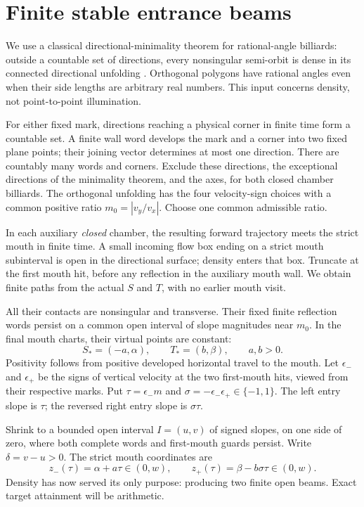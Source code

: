 \documentclass[11pt]{article}
\theoremstyle{definition}
\begin{document}
\section{Finite stable entrance beams}
We use a classical directional-minimality theorem for rational-angle billiards: outside a countable set of directions, every nonsingular semi-orbit is dense in its connected directional unfolding \cite{zk,mt}. Orthogonal polygons have rational angles even when their side lengths are arbitrary real numbers. This input concerns density, not point-to-point illumination.

For either fixed mark, directions reaching a physical corner in finite time form a countable set. A finite wall word develops the mark and a corner into two fixed plane points; their joining vector determines at most one direction. There are countably many words and corners. Exclude these directions, the exceptional directions of the minimality theorem, and the axes, for both closed chamber billiards. The orthogonal unfolding has the four velocity-sign choices with a common positive ratio $m_0=|v_y/v_x|$. Choose one common admissible ratio.

In each auxiliary \emph{closed} chamber, the resulting forward trajectory meets the strict mouth in finite time. A small incoming flow box ending on a strict mouth subinterval is open in the directional surface; density enters that box. Truncate at the first mouth hit, before any reflection in the auxiliary mouth wall. We obtain finite paths from the actual $S$ and $T$, with no earlier mouth visit.

All their contacts are nonsingular and transverse. Their fixed finite reflection words persist on a common open interval of slope magnitudes near $m_0$. In the final mouth charts, their virtual points are constant:
\[
 S_*=(-a,\alpha),\qquad T_*=(b,\beta),\qquad a,b>0.
\]
Positivity follows from positive developed horizontal travel to the mouth. Let $\epsilon_-$ and $\epsilon_+$ be the signs of vertical velocity at the two first-mouth hits, viewed from their respective marks. Put $\tau=\epsilon_-m$ and $\sigma=-\epsilon_-\epsilon_+\in\{-1,1\}$. The left entry slope is $\tau$; the reversed right entry slope is $\sigma\tau$.

Shrink to a bounded open interval $I=(u,v)$ of signed slopes, on one side of zero, where both complete words and first-mouth guards persist. Write $\delta=v-u>0$. The strict mouth coordinates are
\[
 z_-(\tau)=\alpha+a\tau\in(0,w),\qquad
 z_+(\tau)=\beta-b\sigma\tau\in(0,w).
\]
Density has now served its only purpose: producing two finite open beams. Exact target attainment will be arithmetic.
\end{document}
